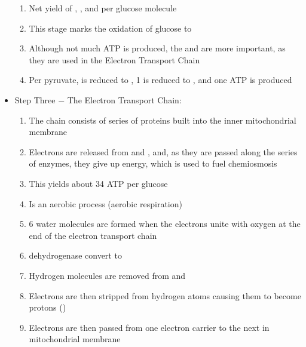 \documentclass[12pt]{article}
\begin{document}
\begin{itemize}
\begin{enumerate}
    \item Net yield of , , and  per glucose molecule

    \item This stage marks the oxidation of glucose to 

    \item Although not much ATP is produced, the  and  are more important, as they are used in the Electron Transport Chain

    \item Per pyruvate,  is reduced to , 1  is reduced to , and one ATP is produced

  \end{enumerate}

\item Step Three $-$ The Electron Transport Chain:

  \begin{enumerate}

    \item The chain consists of series of proteins built into the inner mitochondrial membrane

    \item Electrons are released from  and , and, as they are passed along the series of enzymes, they give up energy, which is used to fuel chemiosmosis

    \item This yields about 34 ATP per glucose

    \item Is an aerobic process (aerobic respiration)

    \item 6 water molecules are formed when the electrons unite with oxygen at the end of the electron transport chain
    
    \item {} dehydrogenase convert  to 

    \item Hydrogen molecules are removed from  and 

    \item Electrons are then stripped from hydrogen atoms causing them to become protons ()

    \item Electrons are then passed from one electron carrier to the next in mitochondrial membrane


\end{enumerate}
\end{itemize}
\end{document}
